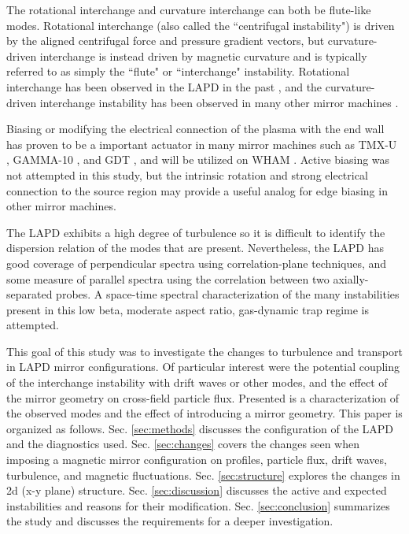 The rotational interchange and curvature interchange can both be flute-like modes. Rotational interchange (also called the ``centrifugal instability") is driven by the aligned centrifugal force and pressure gradient vectors, but curvature-driven interchange is instead driven by magnetic curvature and is typically referred to as simply the ``flute" or ``interchange" instability. Rotational interchange \cite{Jassby_transverse_1972} has been observed in the LAPD in the past \cite{Schaffner_2012, Schaffner_2013}, and the curvature-driven interchange instability has been observed in many other mirror machines \cite{wickham_curvature-induced_1982, ferron_interchange_1983, Post_1987}. 

Biasing or modifying the electrical connection of the plasma with the end wall has proven to be a important actuator in many mirror machines such as TMX-U \cite{Hooper_1984}, GAMMA-10 \cite{Mase_1991}, and GDT \cite{Bagryansky_2003, Bagryansky_2007, Beklemishev_2010}, and will be utilized on WHAM \cite{WHAM}. Active biasing was not attempted in this study, but the intrinsic rotation and strong electrical connection to the source region may provide a useful analog for edge biasing in other mirror machines.

The LAPD exhibits a high degree of turbulence so it is difficult to identify the dispersion relation of the modes that are present. Nevertheless, the LAPD has good coverage of perpendicular spectra using correlation-plane techniques, and some measure of parallel spectra using the correlation between two axially-separated probes. A space-time spectral characterization of the many instabilities present in this low beta, moderate aspect ratio, gas-dynamic trap regime is attempted.

This goal of this study was to investigate the changes to turbulence and transport in LAPD mirror configurations. Of particular interest were the potential coupling of the interchange instability with drift waves or other modes, and the effect of the mirror geometry on cross-field particle flux. Presented is a characterization of the observed modes and the effect of introducing a mirror geometry.
This paper is organized as follows. Sec. \ref{sec:methods} discusses the configuration of the LAPD and the diagnostics used. Sec. \ref{sec:changes} covers the changes seen when imposing a magnetic mirror configuration on profiles, particle flux, drift waves, turbulence, and magnetic fluctuations. Sec. \ref{sec:structure} explores the changes in 2d (x-y plane) structure. Sec. \ref{sec:discussion} discusses the active and expected instabilities and reasons for their modification. Sec. \ref{sec:conclusion} summarizes the study and discusses the requirements for a deeper investigation.

